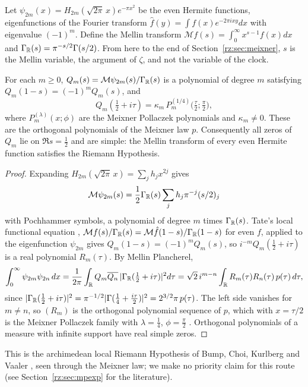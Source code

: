 Let $\psi_{2m}(x)=H_{2m}(\sqrt{2\pi}\,x)e^{-\pi x^2}$ be the even Hermite functions, eigenfunctions of the Fourier transform $\hat f(y)=\int f(x)e^{-2\pi ixy}dx$ with eigenvalue $(-1)^m$. Define the Mellin transform $\mathcal Mf(s)=\int_0^\infty x^{s-1}f(x)dx$ and $\Gamma_{\mathbb{R}}(s)=\pi^{-s/2}\Gamma(s/2)$. From here to the end of Section~\ref{rz:sec:meixner}, $s$ is the Mellin variable, the argument of $\zeta$, and not the variable of the clock.

\begin{theorem}\label{rz:thm:localRH}
For each $m\ge0$, $Q_m(s)=\mathcal M\psi_{2m}(s)/\Gamma_{\mathbb{R}}(s)$ is a polynomial of degree $m$ satisfying $Q_m(1-s)=(-1)^mQ_m(s)$, and
\[
Q_m(\tfrac12+i\tau)=\kappa_m\,P_m^{(1/4)}\bigl(\tfrac\tau2;\tfrac\pi2\bigr),
\]
where $P_m^{(\lambda)}(x;\phi)$ are the Meixner Pollaczek polynomials and $\kappa_m\ne0$. These are the orthogonal polynomials of the Meixner law $p$. Consequently all zeros of $Q_m$ lie on $\Re s=\frac12$ and are simple: the Mellin transform of every even Hermite function satisfies the Riemann Hypothesis.
\end{theorem}

\begin{proof}
Expanding $H_{2m}(\sqrt{2\pi}\,x)=\sum_jh_jx^{2j}$ gives
\[
\mathcal M\psi_{2m}(s)=\frac12\Gamma_{\mathbb{R}}(s)\sum_jh_j\pi^{-j}(s/2)_j
\]
with Pochhammer symbols, a polynomial of degree $m$ times $\Gamma_{\mathbb{R}}(s)$. Tate's local functional equation \cite[Theorem 2.4.1 and Section 2.5]{Tate67}, $\mathcal Mf(s)/\Gamma_{\mathbb{R}}(s)=\mathcal M\hat f(1-s)/\Gamma_{\mathbb{R}}(1-s)$ for even $f$, applied to the eigenfunction $\psi_{2m}$ gives $Q_m(1-s)=(-1)^mQ_m(s)$, so $i^{-m}Q_m(\frac12+i\tau)$ is a real polynomial $R_m(\tau)$. By Mellin Plancherel,
\[
\int_0^\infty\psi_{2m}\psi_{2n}\,dx=\frac1{2\pi}\int_{\mathbb{R}}Q_m\overline{Q_n}\,|\Gamma_{\mathbb{R}}(\tfrac12+i\tau)|^2d\tau=\sqrt2\,i^{m-n}\int_{\mathbb{R}} R_m(\tau)R_n(\tau)\,p(\tau)\,d\tau,
\]
since $|\Gamma_{\mathbb{R}}(\frac12+i\tau)|^2=\pi^{-1/2}|\Gamma(\frac14+\frac{i\tau}2)|^2=2^{3/2}\pi\,p(\tau)$. The left side vanishes for $m\ne n$, so $(R_m)$ is the orthogonal polynomial sequence of $p$, which with $x=\tau/2$ is the Meixner Pollaczek family with $\lambda=\frac14$, $\phi=\frac\pi2$ \cite[Section 9.7]{KLS}. Orthogonal polynomials of a measure with infinite support have real simple zeros.
\end{proof}

This is the archimedean local Riemann Hypothesis of Bump, Choi, Kurlberg and Vaaler \cite{BCKV}, seen through the Meixner law; we make no priority claim for this route (see Section~\ref{rz:sec:mpexp} for the literature).


